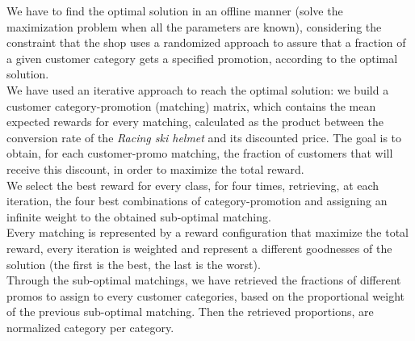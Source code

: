 We have to find the optimal solution in an offline manner (solve the maximization problem when all the parameters are known), considering the constraint that the shop uses a randomized approach to assure that a fraction of a given customer category gets a specified promotion, according to the optimal solution.\\ 
We have used an iterative approach to reach the optimal solution: we build a customer category-promotion (matching) matrix, which contains the mean expected rewards for every matching, calculated as the product between the conversion rate of the \textit{Racing ski helmet} and its discounted price.
The goal is to obtain, for each customer-promo matching, the fraction of customers that will receive this discount, in order to maximize the total reward.\\
We select the best reward for every class, for four times, retrieving, at each iteration, the four best combinations of category-promotion and assigning an infinite weight to the obtained sub-optimal matching.\\
Every matching is represented by a reward configuration that maximize the total reward, every iteration is weighted and represent a different goodnesses of the solution (the first is the best, the last is the worst).\\
Through the sub-optimal matchings, we have retrieved the fractions of different promos to assign to every customer categories, based on the proportional weight of the previous sub-optimal matching. Then the retrieved proportions, are normalized category per category.

